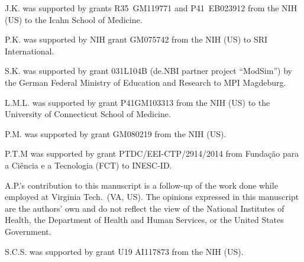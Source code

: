 \documentclass{sbml-paper}
\begin{document}
J.K. was supported by grants \No R35~GM119771 and P41~EB023912 from the NIH (US) to the Icahn School of Medicine.

P.K. was supported by NIH grant \No GM075742 from the NIH (US) to SRI International.

S.K. was supported by grant \No 031L104B (de.NBI partner project ``ModSim'') by the German Federal Ministry of Education and Research to MPI Magdeburg.

L.M.L. was supported by grant \No P41GM103313 from the NIH (US) to the University of Connecticut School of Medicine.

P.M. was supported by grant \No GM080219 from the NIH (US).

P.T.M was supported by grant \No PTDC/EEI-CTP/2914/2014 from Fundação para a Ciência e a Tecnologia (FCT) to INESC-ID.

A.P.'s contribution to this manuscript is a follow-up of the work done while employed at Virginia Tech.\ (VA, US). The opinions expressed in this manuscript are the authors' own and do not reflect the view of the National Institutes of Health, the Department of Health and Human Services, or the United States Government.

S.C.S. was supported by grant \No U19 AI117873 from the NIH (US).
\end{document}

